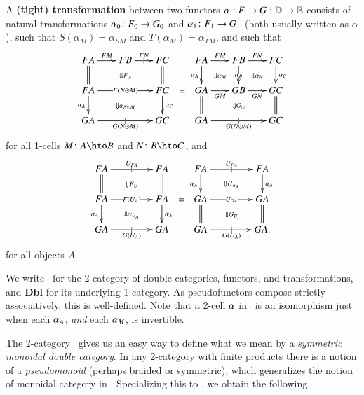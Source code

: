 \begin{defn}\label{thm:dbl-transf}
  A \textbf{(tight) transformation} between two functors $\alpha:
  F\to G:\mathbb{D}\to\mathbb{E}$ consists of natural transformations $\alpha_0\colon
  F_0\to G_0$ and $\alpha_1\colon F_1\to G_1$ (both usually written as
  $\alpha$), such that $S(\alpha_{M}) = \alpha_{SM}$ and
  $T(\alpha_{M}) = \alpha_{TM}$, and such that
  \[\vcenter{\xymatrix@-.5pc{
      FA \ar@{=}[d] \ar[r]|{|}^{FM}
      \ar@{}[drr]|{\Downarrow F_\odot} &
      FB \ar[r]|{|}^{FN} &
      FC \ar@{=}[d]\\
      FA \ar[rr]|{F(N\odot M)} \ar[d]_{\alpha_A}
      \ar@{}[drr]|{\Downarrow \alpha_{N\odot M}} &&
      FC \ar[d]^{\alpha_C}\\
      GA \ar[rr]|{|}_{G(N\odot M)} && GC
    }} =
  \vcenter{\xymatrix@-.5pc{
      FA \ar[d]_{\alpha_A} \ar@{}[dr]|{\Downarrow \alpha_M} \ar[r]|{|}^{FM} &
      FB \ar[d]|{\alpha_B} \ar@{}[dr]|{\Downarrow \alpha_N} \ar[r]|{|}^{FN} &
      FC \ar[d]^{\alpha_C}\\
      GA \ar@{=}[d] \ar[r]|{|}_{GM} \ar@{}[drr]|{\Downarrow G_\odot} &
      GB \ar[r]|{|}_{GN} &
      GC \ar@{=}[d]\\
      GA \ar[rr]|{|}_{G(N\odot M)} && GC
    }}\]
  for all 1-cells $M\colon A\hto B$ and $N\colon B\hto C$, and
  \[\vcenter{\xymatrix@-.5pc{
      FA \ar[rr]|{|}^{U_{FA}} \ar@{=}[d]
      \ar@{}[drr]|{\Downarrow F_U} &&
      FA \ar@{=}[d]\\
      FA \ar[rr]|{F(U_A)} \ar[d]_{\alpha_A}
      \ar@{}[drr]|{\Downarrow \alpha_{U_A}} &&
      FA \ar[d]^{\alpha_A}\\
      GA \ar[rr]|{|}_{G(U_A)} && GA
    }} =
  \vcenter{\xymatrix@-.5pc{
      FA \ar[rr]|{|}^{U_{FA}} \ar[d]_{\alpha_A}
      \ar@{}[drr]|{\Downarrow U_{\alpha_A}} &&
      FA \ar[d]^{\alpha_A}\\
      GA \ar[rr]|{U_{GA}} \ar@{=}[d]
      \ar@{}[drr]|{\Downarrow G_U} &&
      GA \ar@{=}[d]\\
      GA \ar[rr]|{|}_{G(U_A)} && GA.
    }}\]
  for all objects $A$.
\end{defn}

We write \cDbl\ for the 2-category of double categories, functors, and
transformations, and $\mathbf{Dbl}$ for its underlying 1-category. As pseudofunctors compose strictly associatively, this is well-defined. Note that a 2-cell $\alpha$ in \cDbl\ is an isomorphism just when each
$\alpha_A$, \emph{and} each $\alpha_M$, is invertible.

The 2-category \cDbl\ gives us an easy way to define what we mean by a
\emph{symmetric monoidal double category}.  In any 2-category with
finite products there is a notion of a \emph{pseudomonoid} (perhaps braided or symmetric), which
generalizes the notion of monoidal category in \cCat.  Specializing
this to \cDbl, we obtain the following.

